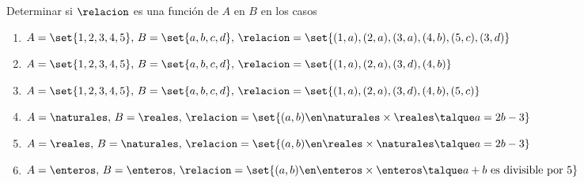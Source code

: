 \def\nodosVeintinueve{
  \node[nodo=black, label=left:$1$] (1) {};
  \node[nodo=black, label=left:$2$, below of=1] (2) {};
  \node[nodo=black, label=left:$3$, below of=2] (3) {};
  \node[nodo=black, label=left:$4$, below of=3] (4) {};
  \node[nodo=black, label=left:$5$, below of=4] (5) {};

  \node[nodo=black, label=right:$a$, right=2cm of 1] (a) {};
  \node[nodo=black, label=right:$b$, below of=a] (b) {};
  \node[nodo=black, label=right:$c$, below of=b] (c) {};
  \node[nodo=black, label=right:$d$, below of=c] (d) {};

  \node[container={$A$}, fit={(1) (2) (3) (4) (5)}]  {};
  \node[container={$B$}, fit={(a) (b) (c) (d)}]  {};
}

\begin{enunciado}{\ejercicio}
  Determinar si $\relacion$ es una función de $A$ en $B$ en los casos
  \begin{enumerate}[label=\roman*)]
    \item $A = \set{1,2,3,4,5},\, B = \set{a,b,c,d},\, \relacion = \set{(1,a), (2,a),(3,a),(4,b),(5,c),(3,d)} $
    \item $A = \set{1,2,3,4,5},\, B = \set{a,b,c,d},\, \relacion = \set{(1,a), (2,a),(3,d),(4,b)}$
    \item $A = \set{1,2,3,4,5},\, B = \set{a,b,c,d},\, \relacion = \set{(1,a), (2,a),(3,d),(4,b),(5,c)} $
    \item $A = \naturales,\, B = \reales, \, \relacion = \set{(a,b) \en \naturales \times \reales \talque a = 2b - 3} $
    \item $A = \reales,\, B = \naturales, \, \relacion = \set{(a,b) \en \reales \times \naturales \talque a = 2b - 3} $
    \item $A = \enteros,\, B = \enteros, \, \relacion = \set{(a,b) \en \enteros \times \enteros \talque a +b \text{ es divisible por }5} $
  \end{enumerate}

\end{enunciado}
